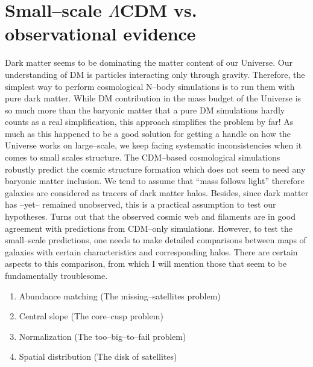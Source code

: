 \documentclass[paper=a4, fontsize=11pt]{scrartcl} %
\numberwithin{equation}{section} %
\numberwithin{figure}{section} %
\numberwithin{table}{section} %
\begin{document}
\section{Small--scale $\Lambda$CDM vs. observational evidence}
Dark matter seems to be dominating the matter content of our Universe. Our understanding of DM is particles interacting only through gravity. Therefore, the simplest way to perform cosmological N--body simulations is to run them with pure dark matter. While DM contribution in the mass budget of the Universe is so much more than the baryonic matter that a pure DM simulations hardly counts as a real simplification, this approach simplifies the problem by far! As much as this happened to be a good solution for getting a handle on how the Universe works on large--scale, we keep facing systematic inconsistencies when it comes to small scales structure. The CDM--based cosmological simulations robustly predict the cosmic structure formation which does not seem to need any baryonic matter inclusion. We tend to assume that ``mass follows light'' therefore galaxies are considered as tracers of dark matter halos. Besides, since dark matter has --yet-- remained unobserved, this is a practical assumption to test our hypotheses. Turns out that the observed cosmic web and filaments are in good agreement with predictions from CDM--only simulations. However, to test the small--scale predictions, one needs to make detailed comparisons between maps of galaxies with certain characteristics and corresponding halos. There are certain aspects to this comparison, from which I will mention those that seem to be fundamentally troublesome.
\begin{enumerate}
\item Abundance matching (The missing--satellites problem)
\item Central slope (The core--cusp problem)
\item Normalization (The too--big--to--fail problem)
\item Spatial distribution (The disk of satellites)
\end{enumerate}
\end{document}
